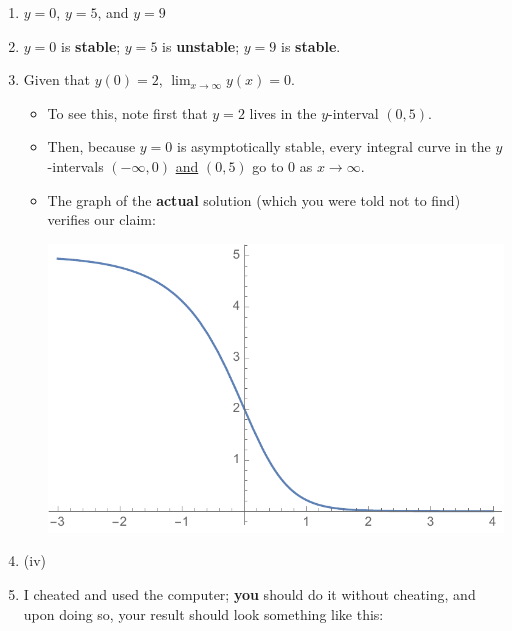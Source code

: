 \documentclass[12pt]{article}
\theoremstyle{definition}
\theoremstyle{underl}
\begin{document}
		\begin{enumerate}[label=(\alph*), itemsep=0.125in, topsep=3mm, leftmargin=0.25in, rightmargin=0.25in]
			\item $y=0$, $y=5$, and $y=9$
			\item $y=0$ is \textbf{stable}; $y=5$ is \textbf{unstable}; $y=9$ is \textbf{stable}.
			\item Given that $y(0)=2$, $\lim_{x\to\infty}y(x)=0$.
			\begin{itemize}[label=$\circ$]
				\item To see this, note first that $y=2$ lives in the $y$-interval $(0,5)$.
				\item Then, because $y=0$ is asymptotically stable, every integral curve in the $y$-intervals $(-\infty,0)$ \ul{and} $(0,5)$ go to 0 as $x\to\infty$.
				\item The graph of the \textbf{actual} solution (which you were told not to find) verifies our claim:
					\begin{center}
						\includegraphics[scale=0.625]{curve}
					\end{center}\vspace{-6mm}
			\end{itemize} 
			\item (iv)
			\item I cheated and used the computer; \textbf{you} should do it without cheating, and upon doing so, your result should look something like this:
				\begin{center}

\end{center}
\end{enumerate}
\end{document}
